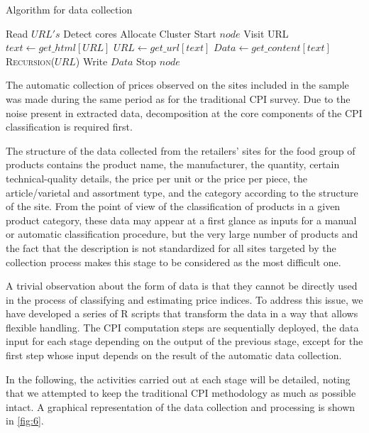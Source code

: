 \documentclass[]{article}
\begin{document}
\begin{algorithm}[h]
	\caption{Algorithm for data collection}
	\label{alg:dc}
	\begin{algorithmic}
		\State Read $URL's$
		\State Detect cores
		\State Allocate Cluster
		 \State Start $node$
		 			\State\Return
		 		\Else
		 			\State Visit URL
		 			\State $text \gets get\_html[URL]$
		 			\State $URL  \gets get\_url[text]$
		 			\State $Data \gets get\_content[text]$
		 			\State \Return \textsc{Recursion}{($URL$)}
		 		\EndIf
			\State Write $Data$
			\EndProcedure
		  \State Stop $node$
		\EndFor	
	\end{algorithmic}
\end{algorithm}





The automatic collection of prices observed on the sites included in the sample was made during
the same period as for the traditional CPI survey. Due to the noise present in extracted data, decomposition at the core components of the CPI classification is required first.


The structure of the data collected from the retailers’ sites for the food group of products contains the product 
name, the manufacturer, the quantity, certain technical-quality details, the price per unit or the price per piece, 
the article/varietal and assortment type, and the category according to the structure of the site. From the point of view 
of the classification of products in a given product category, these data may appear at a first glance 
as inputs for a manual or automatic classification procedure, but the very large number of products and the fact 
that the description is not standardized for all sites targeted by the collection process makes this stage to be considered as the most difficult one.

A trivial observation about the form of data is that they cannot be directly used in the process of classifying 
and estimating price indices. To address this issue, we have developed a series of R scripts that transform 
the data in a way that allows flexible handling. The CPI computation steps are sequentially deployed, the data 
input for each stage depending on the output of the previous stage, except for the first step whose input depends 
on the result of the automatic data collection.



In the following, the activities carried out at each stage will be detailed, noting that we attempted to keep the 
traditional CPI methodology as much as possible intact. A graphical representation of the data collection and processing is shown in \ref{fig:6}.
\end{document}
